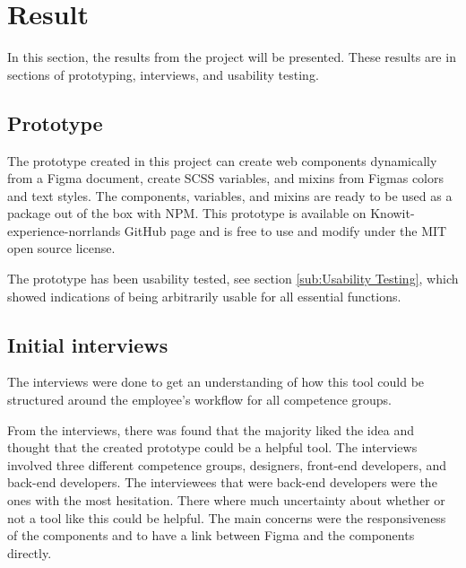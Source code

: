 \section{Result}


In this section, the results from the project will be presented. These results are in sections of prototyping, interviews, and usability testing.

\subsection{Prototype}%
\label{sub:Prototype}
The prototype created in this project can create web components dynamically from a Figma document, create SCSS variables, and mixins from Figmas colors and text styles. The components, variables, and mixins are ready to be used as a package out of the box with NPM. This prototype is available on Knowit- experience-norrlands GitHub page and is free to use and modify under the MIT open source license. 

The prototype has been usability tested, see section \ref{sub:Usability Testing}, which showed indications of being arbitrarily usable for all essential functions. 

\subsection{Initial interviews}%
\label{sub:Initial interviews}
The interviews were done to get an understanding of how this tool could be structured around the employee's workflow for all competence groups.

From the interviews, there was found that the majority liked the idea and thought that the created prototype could be a helpful tool.  The interviews involved three different competence groups, designers, front-end developers, and back-end developers. The interviewees that were back-end developers were the ones with the most hesitation. There where much uncertainty about whether or not a tool like this could be helpful. The main concerns were the responsiveness of the components and to have a link between Figma and the components directly.

